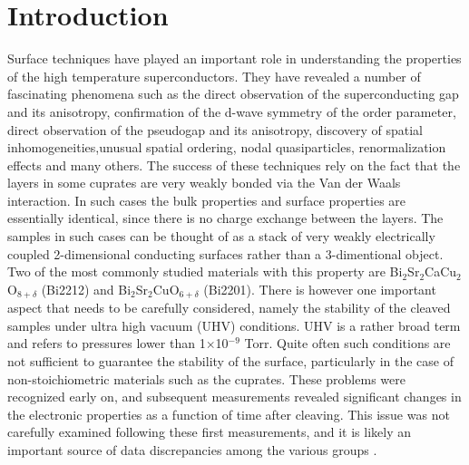 \documentclass[aps,twocolumn,amsmath,amssymb,showpacs,prb,
superscriptaddress,unsortedaddress]{revtex4}
\begin{document}

\maketitle

\section{Introduction}

Surface techniques have played an important role in understanding the
properties of the high temperature superconductors. They have revealed
a number of fascinating phenomena such as the direct observation of
the superconducting gap\cite{OLSON} and its
anisotropy\cite{SHENSC,HONGSC}, confirmation of the d-wave symmetry of
the order parameter, direct observation of the pseudogap and its
anisotropy\cite{HONGPG, LOESERPG,MIKEPG}, discovery of spatial
inhomogeneities\cite{DAVIS,YAZDANI},unusual spatial
ordering,\cite{DAVISCHECKER} nodal quasiparticles\cite{KAMINSKIQP},
renormalization effects\cite{VALLA,BOGDANOV,KAMINSKIKINK} and many
others\cite{SHENREVIEW,JCREVIEW}. The success of these techniques rely
on the fact that the layers in some cuprates are very weakly bonded
via the Van der Waals interaction. In such cases the bulk properties
and surface properties are essentially identical, since there is no
charge exchange between the layers. The samples in such cases can be
thought of as a stack of very weakly electrically coupled
2-dimensional conducting surfaces rather than a 3-dimentional object.
Two of the most commonly studied materials with this property are
Bi$_2$Sr$_2$CaCu$_2$O$_{8+\delta}$ (Bi2212) and
Bi$_2$Sr$_2$CuO$_{6+\delta}$ (Bi2201). There is however one important
aspect that needs to be carefully considered, namely the stability of
the cleaved samples under ultra high vacuum (UHV) conditions. UHV is a
rather broad term and refers to pressures lower than
1$\times$10$^{-9}$ Torr. Quite often such conditions are not
sufficient to guarantee the stability of the surface, particularly in
the case of non-stoichiometric materials such as the cuprates. These
problems were recognized early on\cite{SHEN1}, and subsequent
measurements revealed significant changes in the electronic properties
as a function of time after cleaving. This issue was not carefully
examined following these first measurements, and it is likely an
important source of data discrepancies among the various groups
\cite{SHENREVIEW,JCREVIEW}.
\end{document}
